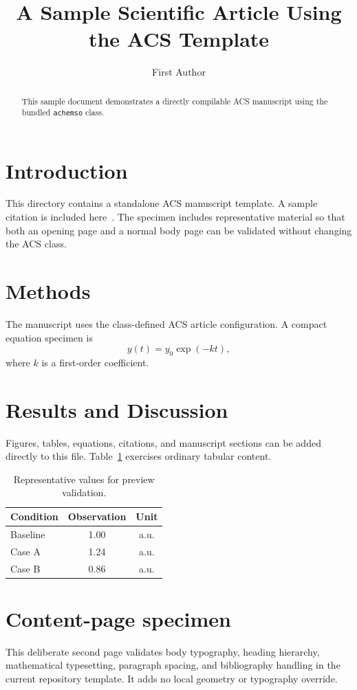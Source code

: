 \documentclass[journal=esthag,manuscript=article]{achemso}
\title{A Sample Scientific Article Using the ACS Template}
\author{First Author}
\affiliation{Department, Research Institution, City, Country}
\begin{document}
\begin{abstract}
This sample document demonstrates a directly compilable ACS manuscript using the bundled \texttt{achemso} class.
\end{abstract}

\section{Introduction}
This directory contains a standalone ACS manuscript template. A sample citation is included here~\cite{sample2026}. The specimen includes representative material so that both an opening page and a normal body page can be validated without changing the ACS class.

\section{Methods}
The manuscript uses the class-defined ACS article configuration. A compact equation specimen is
\begin{equation}
  y(t)=y_0\exp(-kt),
\end{equation}
where $k$ is a first-order coefficient.

\section{Results and Discussion}
Figures, tables, equations, citations, and manuscript sections can be added directly to this file. Table~\ref{tab:sample} exercises ordinary tabular content.

\begin{table}[htbp]
\caption{Representative values for preview validation.}\label{tab:sample}
\centering
\begin{tabular}{lcc}
\toprule
Condition & Observation & Unit \\
\midrule
Baseline & 1.00 & a.u. \\
Case A & 1.24 & a.u. \\
Case B & 0.86 & a.u. \\
\bottomrule
\end{tabular}
\end{table}

\clearpage
\section{Content-page specimen}
This deliberate second page validates body typography, heading hierarchy, mathematical typesetting, paragraph spacing, and bibliography handling in the current repository template. It adds no local geometry or typography override.
\end{document}
